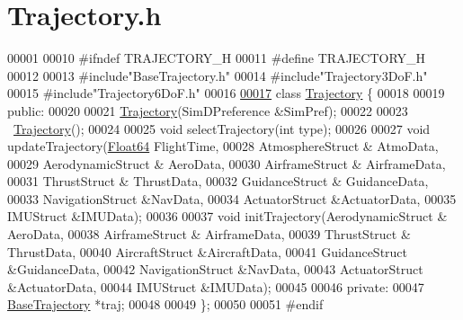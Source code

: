\hypertarget{_trajectory_8h_source}{}\section{Trajectory.\+h}
\label{_trajectory_8h_source}

\begin{DoxyCode}
00001 
00010 \textcolor{preprocessor}{#ifndef TRAJECTORY\_H}
00011 \textcolor{preprocessor}{#define TRAJECTORY\_H}
00012 
00013 \textcolor{preprocessor}{#include"BaseTrajectory.h"}
00014 \textcolor{preprocessor}{#include"Trajectory3DoF.h"}
00015 \textcolor{preprocessor}{#include"Trajectory6DoF.h"}
00016 
\hyperlink{group___trajectory}{00017} \textcolor{keyword}{class }\hyperlink{group___trajectory_class_trajectory}{Trajectory} \{
00018 
00019 \textcolor{keyword}{public}:
00020 
00021     \hyperlink{group___trajectory_class_trajectory}{Trajectory}(SimDPreference &SimPref);
00022 
00023     ~\hyperlink{group___trajectory_class_trajectory}{Trajectory}();
00024 
00025     \textcolor{keywordtype}{void} selectTrajectory(\textcolor{keywordtype}{int} type);
00026 
00027     \textcolor{keywordtype}{void} updateTrajectory(\hyperlink{group___tools_ga3f1431cb9f76da10f59246d1d743dc2c}{Float64} FlightTime,
00028                         AtmosphereStruct & AtmoData,
00029                         AerodynamicStruct & AeroData,
00030                         AirframeStruct & AirframeData,
00031                         ThrustStruct & ThrustData,
00032                         GuidanceStruct & GuidanceData, 
00033                         NavigationStruct &NavData, 
00034                         ActuatorStruct &ActuatorData, 
00035                         IMUStruct &IMUData);
00036 
00037     \textcolor{keywordtype}{void} initTrajectory(AerodynamicStruct & AeroData,
00038                         AirframeStruct & AirframeData,
00039                         ThrustStruct & ThrustData,
00040                         AircraftStruct &AircraftData,
00041                         GuidanceStruct &GuidanceData,
00042                         NavigationStruct &NavData,
00043                         ActuatorStruct &ActuatorData,
00044                         IMUStruct &IMUData);
00045 
00046 \textcolor{keyword}{private}:
00047     \hyperlink{group___trajectory_class_base_trajectory}{BaseTrajectory} *traj;
00048     
00049 \};
00050 
00051 \textcolor{preprocessor}{#endif}
\end{DoxyCode}
